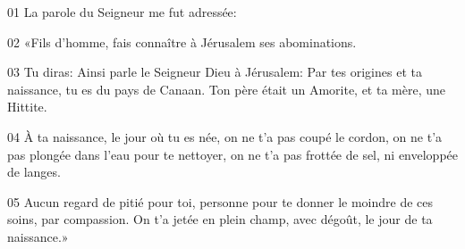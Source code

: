 01 La parole du Seigneur me fut adressée:

02 «Fils d’homme, fais connaître à Jérusalem ses abominations.

03 Tu diras: Ainsi parle le Seigneur Dieu à Jérusalem: Par tes origines et ta naissance, tu es du pays de Canaan. Ton père était un Amorite, et ta mère, une Hittite.

04 À ta naissance, le jour où tu es née, on ne t’a pas coupé le cordon, on ne t’a pas plongée dans l’eau pour te nettoyer, on ne t’a pas frottée de sel, ni enveloppée de langes.

05 Aucun regard de pitié pour toi, personne pour te donner le moindre de ces soins, par compassion. On t’a jetée en plein champ, avec dégoût, le jour de ta naissance.»